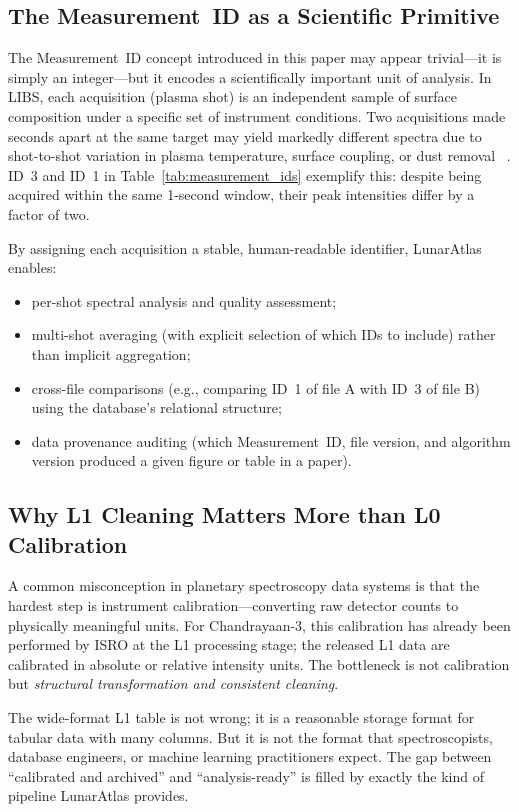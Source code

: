 \documentclass[a4paper,twocolumn,10pt]{article}
\begin{document}
\subsection{The Measurement~ID as a Scientific Primitive}

The Measurement~ID concept introduced in this paper may appear
trivial---it is simply an integer---but it encodes a scientifically
important unit of analysis.  In LIBS, each acquisition (plasma shot)
is an independent sample of surface composition under a specific set
of instrument conditions.  Two acquisitions made seconds apart at the
same target may yield markedly different spectra due to shot-to-shot
variation in plasma temperature, surface coupling, or dust removal
~\cite{Wiens2012}.  ID~3 and ID~1 in Table~\ref{tab:measurement_ids}
exemplify this: despite being acquired within the same 1-second window,
their peak intensities differ by a factor of two.

By assigning each acquisition a stable, human-readable identifier,
LunarAtlas enables:
\begin{itemize}[nosep,leftmargin=*]
  \item per-shot spectral analysis and quality assessment;
  \item multi-shot averaging (with explicit selection of which IDs to
    include) rather than implicit aggregation;
  \item cross-file comparisons (e.g., comparing ID~1 of file A with
    ID~3 of file B) using the database's relational structure;
  \item data provenance auditing (which Measurement~ID, file version,
    and algorithm version produced a given figure or table in a paper).
\end{itemize}

\subsection{Why L1 Cleaning Matters More than L0 Calibration}

A common misconception in planetary spectroscopy data systems is that
the hardest step is instrument calibration---converting raw detector
counts to physically meaningful units.  For Chandrayaan-3, this
calibration has already been performed by ISRO at the L1 processing
stage; the released L1 data are calibrated in absolute or relative
intensity units.  The bottleneck is not calibration but
\emph{structural transformation and consistent cleaning}.

The wide-format L1 table is not wrong; it is a reasonable storage
format for tabular data with many columns.  But it is not the format
that spectroscopists, database engineers, or machine learning
practitioners expect.  The gap between ``calibrated and archived'' and
``analysis-ready'' is filled by exactly the kind of pipeline LunarAtlas
provides.
\end{document}
